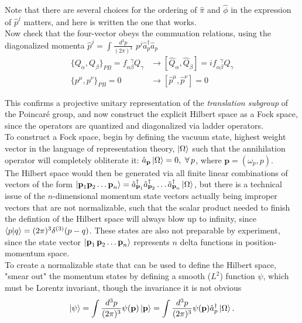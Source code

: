\noindent Note that there are several choices for the ordering of $\hat{\pi}$ and $\hat{\phi}$ in the expression of $\hat{p}^j$ matters, and here is written the one that works. \\

\noindent Now check that the four-vector obeys the commuation relations, using the diagonalized momenta $\hat{p}^j = \int \frac{d^3 p}{(2\pi)^3} \,\, p^j \hat{a}_p^\dagger \hat{a}_p$
\begin{align}
\{Q_\alpha, Q_\beta\}_{PB} = f_{\alpha \beta}^{\,\,\,\, \gamma} Q_\gamma &\rightarrow [\hat{Q}_\alpha, \hat{Q}_\beta] = i f_{\alpha \beta}^{\,\,\,\, \gamma} Q_\gamma \\
\{p^\mu, p^\nu\}_{PB} = 0 &\rightarrow [\hat{p}^\mu, \hat{p}^\nu] = 0
\end{align}

\noindent This confirms a projective unitary representation of the \textit{translation subgroup} of the Poincar\'e group, and now construct the explicit Hilbert space as a Fock space, since the operators are quantized and diagonalized via ladder operators. \\

\noindent To construct a Fock space, begin by defining the vacuum state, highest weight vector in the language of representation theory,  $\ket{\Omega}$ such that the annihilation operator will completely obliterate it: $\hat{a}_{\textbf{p}} \ket{\Omega} = 0, \,\, \forall \, p$, where $\textbf{p}=(\omega_p, p)$. \\

\noindent The Hilbert space would then be generated via all finite linear combinations of vectors of the form 
$\ket{\textbf{p}_1 \textbf{p}_2 \dots \textbf{p}_n} = \hat{a}_{\textbf{p}_1}^\dagger \hat{a}_{\textbf{p}_2}^\dagger \dots \hat{a}_{\textbf{p}_n}^\dagger \ket{\Omega}$, but there is a technical issue of the $n$-dimensional momentum state vectors actually being improper vectors that are not normalizable, such that the scalar product needed to finish the defintion of the Hilbert space will always blow up to infinity, since $\braket{p|q} = (2 \pi)^3 \delta^{(3)}(p-q)$. These states are also not preparable by experiment, since the state vector $\ket{\textbf{p}_1 \, \textbf{p}_2 \dots \textbf{p}_n}$ represents $n$ delta functions in position-momentum space.  \\

\noindent To create a normalizable state that can be used to define the Hilbert space, "smear out" the momentum states by defining a smooth ($L^2$) function $\psi$, which must be Lorentz invariant, though the invariance it is not obvious
\begin{equation}
\ket{\psi} = \int \frac{d^3 p}{(2\pi)^3} \psi(\textbf{p}) \ket{\textbf{p}} = \int \frac{d^3 p}{(2\pi)^3} \psi(\textbf{p}) \hat{a}_p^\dagger \ket{\Omega}.
\end{equation}

